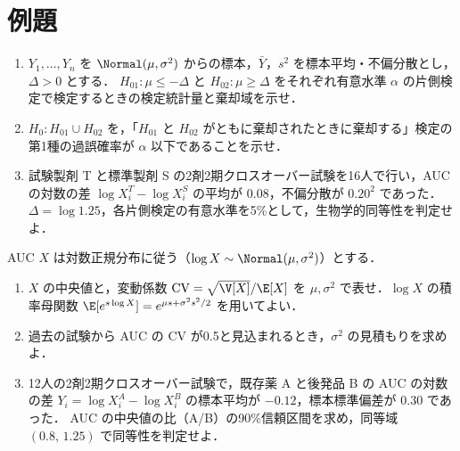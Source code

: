 \section{例題}\label{sec:m10-reidai}
\begin{reidai}\label{reidai:m10-1}
\begin{enumerate}[label=〔\arabic*〕]
\item $Y_1,\dots,Y_n$ を $\Normal(\mu,\sigma^2)$ からの標本，$\bar Y$，$s^2$ を標本平均・不偏分散とし，$\Delta>0$ とする．
      $H_{01}:\mu\le-\Delta$ と $H_{02}:\mu\ge\Delta$ をそれぞれ有意水準 $\alpha$ の片側検定で検定するときの検定統計量と棄却域を示せ．
\item $H_0:H_{01}\cup H_{02}$ を，「$H_{01}$ と $H_{02}$ がともに棄却されたときに棄却する」検定の第1種の過誤確率が $\alpha$ 以下であることを示せ．
\item 試験製剤 T と標準製剤 S の2剤2期クロスオーバー試験を16人で行い，AUC の対数の差 $\log X_i^T-\log X_i^S$ の平均が $0.08$，不偏分散が $0.20^2$ であった．
      $\Delta=\log1.25$，各片側検定の有意水準を5\%として，生物学的同等性を判定せよ．
\end{enumerate}
\end{reidai}

\begin{reidai}\label{reidai:m10-2}
AUC $X$ は対数正規分布に従う（$\log X\sim\Normal(\mu,\sigma^2)$）とする．
\begin{enumerate}[label=〔\arabic*〕]
\item $X$ の中央値と，変動係数 $\mathrm{CV}=\sqrt{\V[X]}/\E[X]$ を $\mu,\sigma^2$ で表せ．$\log X$ の積率母関数 $\E[e^{s\log X}]=e^{\mu s+\sigma^2s^2/2}$ を用いてよい．
\item 過去の試験から AUC の CV が0.5と見込まれるとき，$\sigma^2$ の見積もりを求めよ．
\item 12人の2剤2期クロスオーバー試験で，既存薬 A と後発品 B の AUC の対数の差 $Y_i=\log X_i^A-\log X_i^B$ の標本平均が $-0.12$，標本標準偏差が $0.30$ であった．
      AUC の中央値の比（A/B）の90\%信頼区間を求め，同等域 $(0.8,\,1.25)$ で同等性を判定せよ．
\end{enumerate}
\end{reidai}

